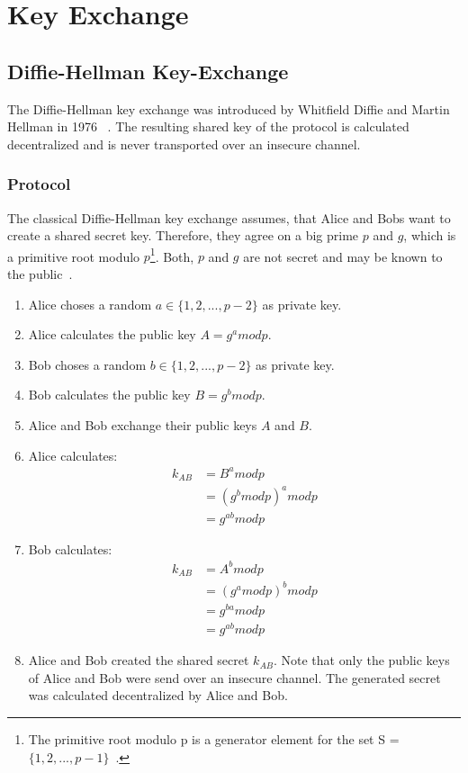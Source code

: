 \section{Key Exchange}
\subsection{Diffie-Hellman Key-Exchange}

The Diffie-Hellman key exchange was introduced by Whitfield Diffie and Martin Hellman in 1976 ~\parencite{diffie1976new}. The resulting shared key of the protocol is calculated decentralized and is never transported over an insecure channel.

\subsubsection{Protocol}
The classical Diffie-Hellman key exchange assumes, that Alice and Bobs want to create a shared secret key. Therefore, they agree on a big prime $p$ and $g$, which is a primitive root modulo $p$\footnote{The primitive root modulo p is a generator element for the set S = $\{1, 2, ... , p-1\}$~\parencite{ITSicherheit}.}. Both, $p$ and $g$ are not secret and may be known to the public~\parencite{watjen2018kryptographie}.

\begin{enumerate}
\item Alice choses a random $a \in \{1, 2, ... , p-2\}$ as private key. 
\item Alice calculates the public key $A = g^a mod p$.
\item Bob choses a random $b \in \{1, 2, ... , p-2\}$ as private key. 
\item Bob calculates the public key $B = g^b mod p$.
\item Alice and Bob exchange their public keys $A$ and $B$.
\item Alice calculates: 
\begin{equation}
\begin{split}
k_{AB} & = B^a mod p \\
 & = (g^b mod p)^a mod p \\
 & = g^{a b} mod p
\end{split}
\end{equation}
\item Bob calculates: 
\begin{equation}
\begin{split}
k_{AB} & = A^b mod p \\
 & = (g^a mod p)^b mod p \\
 & = g^{b a} mod p \\
 & = g^{a b} mod p
\end{split}
\end{equation}
\item Alice and Bob created the shared secret $k_{AB}$. Note that only the public keys of Alice and Bob were send over an insecure channel. The generated secret was calculated decentralized by Alice and Bob.
\end{enumerate}

